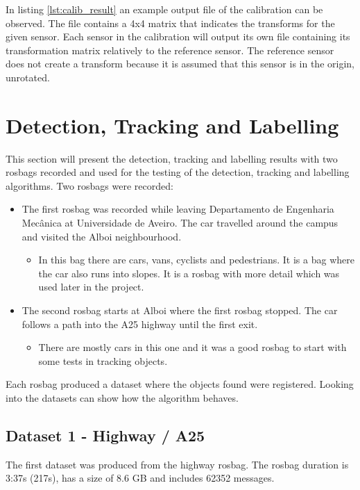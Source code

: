 In listing \ref{lst:calib_result} an example output file of the calibration can be observed. The file contains a 4x4 matrix that indicates the transforms for the given sensor. Each sensor in the calibration will output its own file containing its transformation matrix relatively to the reference sensor. The reference sensor does not create a transform because it is assumed that this sensor is in the origin, unrotated. 

\section{Detection, Tracking and Labelling}

This section will present the detection, tracking and labelling results with two rosbags recorded and used for the testing of the detection, tracking and labelling algorithms. Two rosbags were recorded:

\begin{itemize}
	\item The first rosbag was recorded while leaving Departamento de Engenharia Mec\^anica at Universidade de Aveiro. The car travelled around the campus and visited the Alboi neighbourhood.
	\begin{itemize}
	\item In this bag there are cars, vans, cyclists and pedestrians. It is a bag where the car also runs into slopes. It is a rosbag with more detail which was used later in the project.
	\end{itemize} 
	\item The second rosbag starts at Alboi where the first rosbag stopped. The car follows a path into the A25 highway until the first exit.
	\begin{itemize}
	\item There are mostly cars in this one and it was a good rosbag to start with some tests in tracking objects.
	\end{itemize} 
\end{itemize} 


Each rosbag produced a dataset where the objects found were registered. Looking into the datasets can show how the algorithm behaves.

\subsection{Dataset 1 - Highway / A25}

The first dataset was produced from the highway rosbag. The rosbag duration is 3:37s (217s), has a size of 8.6 GB and includes 62352 messages.

